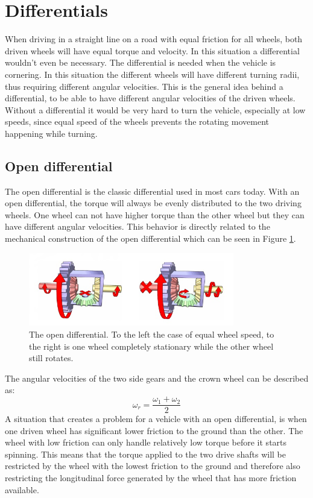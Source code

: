 \section{Differentials}
When driving in a straight line on a road with equal friction for all wheels, both driven wheels will have equal torque and velocity. In this situation a differential wouldn't even be necessary. The differential is needed when the vehicle is cornering. In this situation the different wheels will have different turning radii, thus requiring different angular velocities. This is the general idea behind a differential, to be able to have different angular velocities of the driven wheels. Without a differential it would be very hard to turn the vehicle, especially at low speeds, since equal speed of the wheels prevents the rotating movement happening while turning.

\subsection{Open differential}
The open differential is the classic differential used in most cars today. With an open differential, the torque will always be evenly distributed to the two driving wheels. One wheel can not have higher torque than the other wheel but they can have different angular velocities. This behavior is directly related to the mechanical construction of the open differential which can be seen in Figure \ref{wikidiff}. 
\begin{figure}[h]
	\centering
	\includegraphics[width=0.8\textwidth]{Pictures/opendiff}
	\caption{The open differential. To the left the case of equal wheel speed, to the right is one wheel completely stationary while the other wheel still rotates. \cite{wikidiff}}
	\label{wikidiff}
\end{figure}
The angular velocities of the two side gears and the crown wheel can be described as:
\begin{equation}
\omega_{r} = \frac{\omega_{1} + \omega_{2}}{2}
\label{eq:diff}
\end{equation}
A situation that creates a problem for a vehicle with an open differential, is when one driven wheel has significant lower friction to the ground than the other. The wheel with low friction can only handle relatively low torque before it starts spinning. This means that the torque applied to the two drive shafts will be restricted by the wheel with the lowest friction to the ground and therefore also restricting the longitudinal force generated by the wheel that has more friction available.

